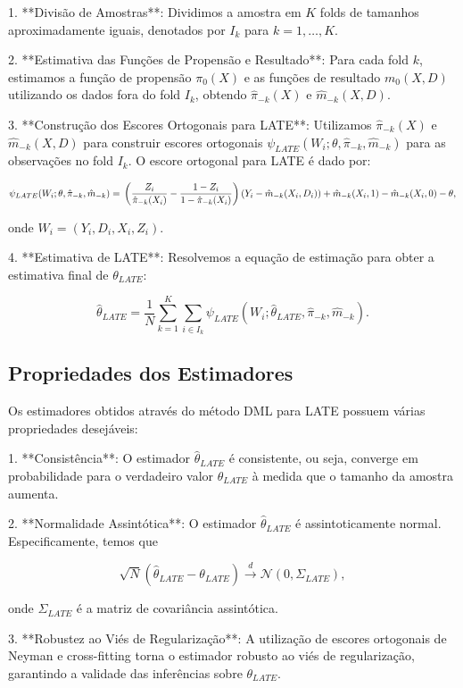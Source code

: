 \documentclass[a4paper,12pt]{article}[abntex2]
\begin{document}
1. **Divisão de Amostras**: Dividimos a amostra em $K$ folds de tamanhos aproximadamente iguais, denotados por $I_k$ para $k = 1, \ldots, K$.

2. **Estimativa das Funções de Propensão e Resultado**: Para cada fold $k$, estimamos a função de propensão $\pi_0(X)$ e as funções de resultado $m_0(X, D)$ utilizando os dados fora do fold $I_k$, obtendo $\hat{\pi}_{-k}(X)$ e $\hat{m}_{-k}(X, D)$.

3. **Construção dos Escores Ortogonais para LATE**: Utilizamos $\hat{\pi}_{-k}(X)$ e $\hat{m}_{-k}(X, D)$ para construir escores ortogonais $\psi_{LATE}(W_i; \theta, \hat{\pi}_{-k}, \hat{m}_{-k})$ para as observações no fold $I_k$. O escore ortogonal para LATE é dado por:

\[
\psi_{LATE}(W_i; \theta, \hat{\pi}_{-k}, \hat{m}_{-k}) = \\

\left( \frac{Z_i}{\hat{\pi}_{-k}(X_i)} - \frac{1 - Z_i}{1 - \hat{\pi}_{-k}(X_i)} \right)(Y_i - \hat{m}_{-k}(X_i, D_i)) + \hat{m}_{-k}(X_i, 1) - \hat{m}_{-k}(X_i, 0) - \theta,
\]

onde $W_i = (Y_i, D_i, X_i, Z_i)$.

4. **Estimativa de LATE**: Resolvemos a equação de estimação para obter a estimativa final de $\theta_{LATE}$:

\[
\hat{\theta}_{LATE} = \frac{1}{N} \sum_{k=1}^K \sum_{i \in I_k} \psi_{LATE}(W_i; \hat{\theta}_{LATE}, \hat{\pi}_{-k}, \hat{m}_{-k}).
\]

\subsection*{Propriedades dos Estimadores}

Os estimadores obtidos através do método DML para LATE possuem várias propriedades desejáveis:

1. **Consistência**: O estimador $\hat{\theta}_{LATE}$ é consistente, ou seja, converge em probabilidade para o verdadeiro valor $\theta_{LATE}$ à medida que o tamanho da amostra aumenta.

2. **Normalidade Assintótica**: O estimador $\hat{\theta}_{LATE}$ é assintoticamente normal. Especificamente, temos que

\[
\sqrt{N}(\hat{\theta}_{LATE} - \theta_{LATE}) \xrightarrow{d} \mathcal{N}(0, \Sigma_{LATE}),
\]

onde $\Sigma_{LATE}$ é a matriz de covariância assintótica.

3. **Robustez ao Viés de Regularização**: A utilização de escores ortogonais de Neyman e cross-fitting torna o estimador robusto ao viés de regularização, garantindo a validade das inferências sobre $\theta_{LATE}$.
\end{document}
